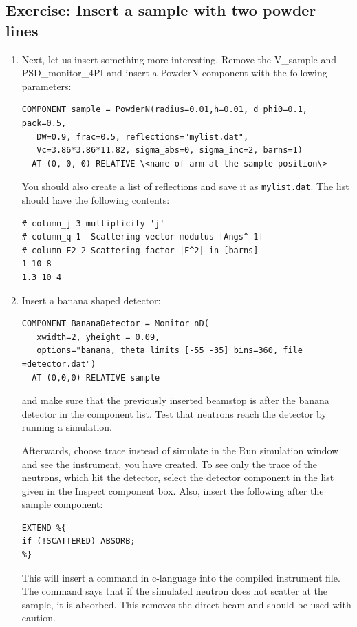 \subsection{Exercise: Insert a sample with two powder lines}
\begin{enumerate}
\item{Next, let us insert something more interesting. Remove the V\_sample and  PSD\_monitor\_4PI and insert a PowderN component with the following parameters:
    \begin{verbatim}
COMPONENT sample = PowderN(radius=0.01,h=0.01, d_phi0=0.1, pack=0.5, 
   DW=0.9, frac=0.5, reflections="mylist.dat",
   Vc=3.86*3.86*11.82, sigma_abs=0, sigma_inc=2, barns=1)
  AT (0, 0, 0) RELATIVE \<name of arm at the sample position\>
\end{verbatim}
You should also create a list of reflections and save it as \texttt{mylist.dat}. The list should have the following contents:
\begin{verbatim}
# column_j 3 multiplicity 'j'
# column_q 1  Scattering vector modulus [Angs^-1]
# column_F2 2 Scattering factor |F^2| in [barns]
1 10 8
1.3 10 4
\end{verbatim}
}
\item{Insert a banana shaped detector:
\begin{verbatim}
COMPONENT BananaDetector = Monitor_nD(
   xwidth=2, yheight = 0.09, 
   options="banana, theta limits [-55 -35] bins=360, file =detector.dat")
  AT (0,0,0) RELATIVE sample
\end{verbatim}
and make sure that the previously inserted beamstop is after the banana detector in the component list. Test that neutrons reach the detector by running a simulation. 

Afterwards, choose trace instead of simulate in the Run simulation window and see the instrument, you have created. To see only the trace of the neutrons, which hit the detector, select the detector component in the list given in the Inspect component box. Also, insert the following after the sample component:
\begin{verbatim}
EXTEND %{ 
if (!SCATTERED) ABSORB;
%}
\end{verbatim}
This will insert a command in c-language into the compiled instrument file. The command says that if the simulated neutron does not scatter at the sample, it is absorbed. This removes the direct beam and should be used with caution.}
\end{enumerate}
